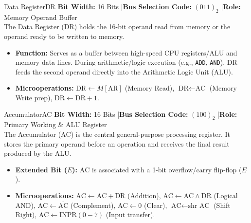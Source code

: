 \documentclass[11pt,a4paper]{article}
\begin{document}
\vspace{0.15cm}

\begin{registerbox}{Data Register}{DR}
\textbf{Bit Width:} 16 Bits \quad|\quad \textbf{Bus Selection Code:} $(011)_2$ \quad|\quad \textbf{Role:} Memory Operand Buffer\\[0.1cm]
The Data Register ($\text{DR}$) holds the 16-bit operand read from memory or the operand ready to be written to memory.
\begin{itemize}[noitemsep,topsep=2pt]
    \item \textbf{Function:} Serves as a buffer between high-speed CPU registers/ALU and memory data lines. During arithmetic/logic execution (e.g., \texttt{ADD}, \texttt{AND}), $\text{DR}$ feeds the second operand directly into the Arithmetic Logic Unit (ALU).
    \item \textbf{Microoperations:} $\text{DR} \leftarrow M[\text{AR}]$ (Memory Read), $\text{DR} \leftarrow \text{AC}$ (Memory Write prep), $\text{DR} \leftarrow \text{DR} + 1$.
\end{itemize}
\end{registerbox}

\vspace{0.15cm}

\begin{registerbox}{Accumulator}{AC}
\textbf{Bit Width:} 16 Bits \quad|\quad \textbf{Bus Selection Code:} $(100)_2$ \quad|\quad \textbf{Role:} Primary Working \& ALU Register\\[0.1cm]
The Accumulator ($\text{AC}$) is the central general-purpose processing register. It stores the primary operand before an operation and receives the final result produced by the ALU.
\begin{itemize}[noitemsep,topsep=2pt]
    \item \textbf{Extended Bit ($E$):} $\text{AC}$ is associated with a 1-bit overflow/carry flip-flop ($E$).
    \item \textbf{Microoperations:} $\text{AC} \leftarrow \text{AC} + \text{DR}$ (Addition), $\text{AC} \leftarrow \text{AC} \wedge \text{DR}$ (Logical AND), $\text{AC} \leftarrow \overline{\text{AC}}$ (Complement), $\text{AC} \leftarrow 0$ (Clear), $\text{AC} \leftarrow \text{shr } \text{AC}$ (Shift Right), $\text{AC} \leftarrow \text{INPR}(0-7)$ (Input transfer).
\end{itemize}
\end{registerbox}

\vspace{0.15cm}
\end{document}
